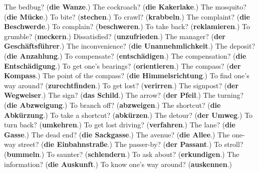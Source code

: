 \begin{tcolorbox}[breakable,colback=teal!4,colframe=teal!35!black,title={Before you move on}]
The bedbug? (\textbf{die Wanze}.) The cockroach? (\textbf{die Kakerlake}.) The mosquito? (\textbf{die Mücke}.) To bite? (\textbf{stechen}.) To crawl? (\textbf{krabbeln}.) The complaint? (\textbf{die Beschwerde}.) To complain? (\textbf{beschweren}.) To take back? (\textbf{reklamieren}.) To grumble? (\textbf{meckern}.) Dissatisfied? (\textbf{unzufrieden}.) The manager? (\textbf{der Geschäftsführer}.) The inconvenience? (\textbf{die Unannehmlichkeit}.) The deposit? (\textbf{die Anzahlung}.) To compensate? (\textbf{entschädigen}.) The compensation? (\textbf{die Entschädigung}.) To get one's bearings? (\textbf{orientieren}.) The compass? (\textbf{der Kompass}.) The point of the compass? (\textbf{die Himmelsrichtung}.) To find one's way around? (\textbf{zurechtfinden}.) To get lost? (\textbf{verirren}.) The signpost? (\textbf{der Wegweiser}.) The sign? (\textbf{das Schild}.) The arrow? (\textbf{der Pfeil}.) The turning? (\textbf{die Abzweigung}.) To branch off? (\textbf{abzweigen}.) The shortcut? (\textbf{die Abkürzung}.) To take a shortcut? (\textbf{abkürzen}.) The detour? (\textbf{der Umweg}.) To turn back? (\textbf{umkehren}.) To get lost driving? (\textbf{verfahren}.) The lane? (\textbf{die Gasse}.) The dead end? (\textbf{die Sackgasse}.) The avenue? (\textbf{die Allee}.) The one-way street? (\textbf{die Einbahnstraße}.) The passer-by? (\textbf{der Passant}.) To stroll? (\textbf{bummeln}.) To saunter? (\textbf{schlendern}.) To ask about? (\textbf{erkundigen}.) The information? (\textbf{die Auskunft}.) To know one's way around? (\textbf{auskennen}.)
\end{tcolorbox}
